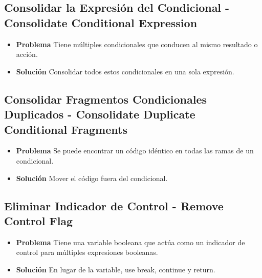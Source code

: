 \documentclass[11pt,a4paper,oneside]{book}
\begin{document}
\subsection{Consolidar la Expresión del Condicional - Consolidate Conditional Expression}  \begin{itemize}
    \item \textbf{Problema} Tiene múltiples condicionales que conducen al mismo resultado o acción.
    
    
    
    \item \textbf{Solución} Consolidar todos estos condicionales en una sola expresión.
    
    
\end{itemize}
    
\subsection{Consolidar Fragmentos Condicionales Duplicados - Consolidate Duplicate Conditional Fragments} 
\begin{itemize}
    \item \textbf{Problema} Se puede encontrar un código idéntico en todas las ramas de un condicional.
    
    
    
    \item \textbf{Solución} Mover el código fuera del condicional.
    
    
\end{itemize}
    
\subsection{Eliminar Indicador de Control - Remove Control Flag} 
 \begin{itemize}
    \item \textbf{Problema} Tiene una variable booleana que actúa como un indicador de control para múltiples expresiones booleanas.
    \item \textbf{Solución} En lugar de la variable, use break, continue y return.
\end{itemize}
    
\end{document}
